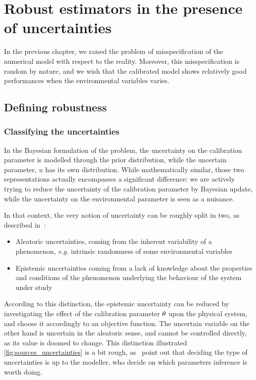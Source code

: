 \documentclass[../../Main_ManuscritThese.tex]{subfiles}
\begin{document}
\chapter{Robust estimators in the presence of uncertainties} 
\label{chap:robust_estimators}

\minitoc
\subfileLocal{\pagestyle{contentStyle}}
In the previous chapter, we raised the problem of misspecification of the numerical model with respect to the reality. Moreover, this misspecification is random by nature, and we wish that the calibrated model shows relatively good performances when the environmental variables varies.

\section{Defining robustness}
\label{sec:def_robustness}
\subsection{Classifying the uncertainties}
In the Bayesian formulation of the problem, the uncertainty on the calibration parameter is modelled through the prior distribution, while the uncertain parameter, $u$ has its own distribution. While mathematically similar, those two representations actually encompasses a significant difference: we are actively trying to reduce the uncertainty of the calibration parameter by Bayesian update, while the uncertainty on the environmental parameter is seen as a nuisance.

In that context, the very notion of uncertainty can be roughly split in two, as described in~\cite{walker_defining_2003}:
\begin{itemize}
\item Aleatoric uncertainties, coming from the inherent variability of a phenomenon, \emph{e.g.} intrinsic randomness of some environmental variables
\item Epistemic uncertainties coming from a lack of knowledge about the properties and conditions of the phenomenon underlying the behaviour of the system under study
\end{itemize}
According to this distinction,  the epistemic uncertainty can be reduced by investigating the effect of the calibration parameter $\theta$ upon the physical system, and choose it accordingly to an objective function.
The uncertain variable on the other hand is uncertain in the aleatoric sense, and cannot be controlled directly, as its value is doomed to change. This distinction illustrated \cref{fig:sources_uncertainties} is a bit rough, as~\cite{kiureghian_aleatory_2009} point out that deciding the type of uncertainties is up to the modeller, who decide on which parameters inference is worth doing.
\end{document}
